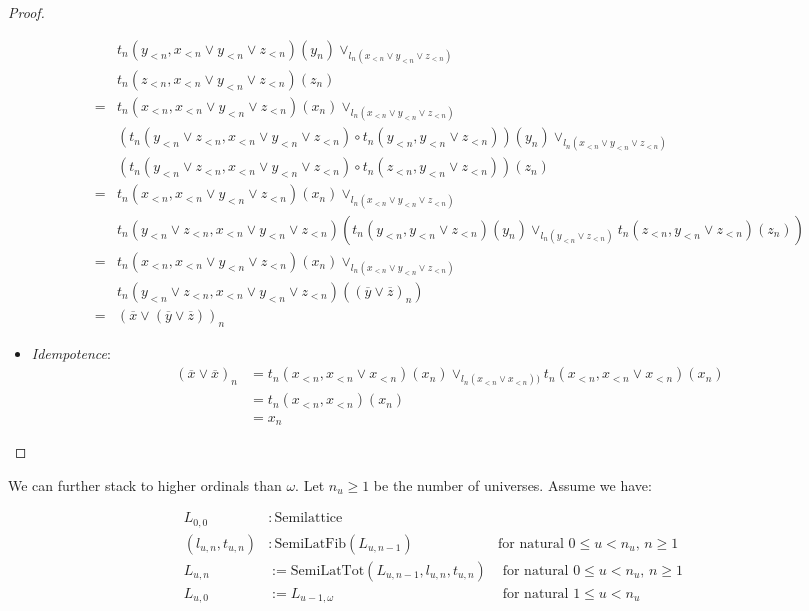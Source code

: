 \documentclass{article}
\begin{document}
\begin{proof}
\begin{itemize}
\begin{align*}
               & t_n(y_{<n}, x_{<n} \vee y_{<n} \vee z_{<n})(y_n) \vee_{l_n(x_{<n} \vee y_{<n} \vee z_{<n})} \\
               & t_n(z_{<n}, x_{<n} \vee y_{<n} \vee z_{<n})(z_n)  \\
              =& t_n(x_{<n}, x_{<n} \vee y_{<n} \vee z_{<n})(x_n) \vee_{l_n(x_{<n} \vee y_{<n} \vee z_{<n})} \\
               & (t_n(y_{<n} \vee z_{<n}, x_{<n} \vee y_{<n} \vee z_{<n}) \circ t_n(y_{<n}, y_{<n} \vee z_{<n}))(y_n) \vee_{l_n(x_{<n} \vee y_{<n} \vee z_{<n})} \\
               & (t_n(y_{<n} \vee z_{<n}, x_{<n} \vee y_{<n} \vee z_{<n}) \circ t_n(z_{<n}, y_{<n} \vee z_{<n}))(z_n)  \\
              =& t_n(x_{<n}, x_{<n} \vee y_{<n} \vee z_{<n})(x_n) \vee_{l_n(x_{<n} \vee y_{<n} \vee z_{<n})} \\
               & t_n(y_{<n} \vee z_{<n}, x_{<n} \vee y_{<n} \vee z_{<n})(
                          t_n(y_{<n}, y_{<n} \vee z_{<n})(y_n) \vee_{l_n(y_{<n} \vee z_{<n})}
                          t_n(z_{<n}, y_{<n} \vee z_{<n})(z_n)) \\
              =& t_n(x_{<n}, x_{<n} \vee y_{<n} \vee z_{<n})(x_n) \vee_{l_n(x_{<n} \vee y_{<n} \vee z_{<n})} \\
               & t_n(y_{<n} \vee z_{<n}, x_{<n} \vee y_{<n} \vee z_{<n})((\overline{y} \vee \overline{z})_n) \\
              =& (\overline{x} \vee (\overline{y} \vee \overline{z}))_n
            \end{align*}
          \item \emph{Idempotence}:
            \begin{align*}
              (\overline{x} \vee \overline{x})_n &= t_n(x_{<n}, x_{<n} \vee x_{<n})(x_n) \vee_{l_n(x_{<n} \vee x_{<n}))} t_n(x_{<n}, x_{<n} \vee x_{<n})(x_n) \\
              &= t_n(x_{<n}, x_{<n})(x_n) \\
              &= x_n
            \end{align*}
        \end{itemize}
      \end{proof}

      We can further stack to higher ordinals than $\omega$. Let $n_u \geq 1$ be the number of universes. Assume we have:

      \begin{align*}
        L_{0, 0} &: \mathrm{Semilattice} & \\
        (l_{u, n}, t_{u, n}) &: \mathrm{SemiLatFib}(L_{u, n-1}) & \text{for natural $0 \leq u < n_u$, $n \geq 1$ } \\
        L_{u, n} &:= \mathrm{SemiLatTot}(L_{u, n-1}, l_{u, n}, t_{u, n})    & \text{ for natural $0 \leq u < n_u$, $n \geq 1$ } \\
        L_{u, 0} &:= L_{u-1, \omega} & \text{ for natural $1 \leq u < n_u$ }
      \end{align*}
\end{document}
